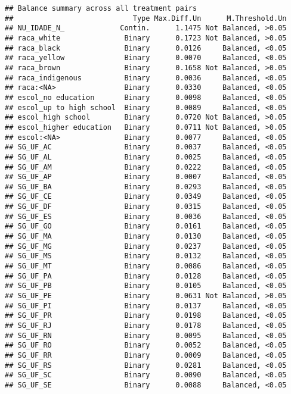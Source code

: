 \documentclass[
]{article}
\begin{document}
\begin{verbatim}
## Balance summary across all treatment pairs
##                            Type Max.Diff.Un      M.Threshold.Un
## NU_IDADE_N_             Contin.      1.1475 Not Balanced, >0.05
## raca_white               Binary      0.1723 Not Balanced, >0.05
## raca_black               Binary      0.0126     Balanced, <0.05
## raca_yellow              Binary      0.0070     Balanced, <0.05
## raca_brown               Binary      0.1658 Not Balanced, >0.05
## raca_indigenous          Binary      0.0036     Balanced, <0.05
## raca:<NA>                Binary      0.0330     Balanced, <0.05
## escol_no education       Binary      0.0098     Balanced, <0.05
## escol_up to high school  Binary      0.0089     Balanced, <0.05
## escol_high school        Binary      0.0720 Not Balanced, >0.05
## escol_higher education   Binary      0.0711 Not Balanced, >0.05
## escol:<NA>               Binary      0.0077     Balanced, <0.05
## SG_UF_AC                 Binary      0.0037     Balanced, <0.05
## SG_UF_AL                 Binary      0.0025     Balanced, <0.05
## SG_UF_AM                 Binary      0.0222     Balanced, <0.05
## SG_UF_AP                 Binary      0.0007     Balanced, <0.05
## SG_UF_BA                 Binary      0.0293     Balanced, <0.05
## SG_UF_CE                 Binary      0.0349     Balanced, <0.05
## SG_UF_DF                 Binary      0.0315     Balanced, <0.05
## SG_UF_ES                 Binary      0.0036     Balanced, <0.05
## SG_UF_GO                 Binary      0.0161     Balanced, <0.05
## SG_UF_MA                 Binary      0.0130     Balanced, <0.05
## SG_UF_MG                 Binary      0.0237     Balanced, <0.05
## SG_UF_MS                 Binary      0.0132     Balanced, <0.05
## SG_UF_MT                 Binary      0.0086     Balanced, <0.05
## SG_UF_PA                 Binary      0.0128     Balanced, <0.05
## SG_UF_PB                 Binary      0.0105     Balanced, <0.05
## SG_UF_PE                 Binary      0.0631 Not Balanced, >0.05
## SG_UF_PI                 Binary      0.0137     Balanced, <0.05
## SG_UF_PR                 Binary      0.0198     Balanced, <0.05
## SG_UF_RJ                 Binary      0.0178     Balanced, <0.05
## SG_UF_RN                 Binary      0.0095     Balanced, <0.05
## SG_UF_RO                 Binary      0.0052     Balanced, <0.05
## SG_UF_RR                 Binary      0.0009     Balanced, <0.05
## SG_UF_RS                 Binary      0.0281     Balanced, <0.05
## SG_UF_SC                 Binary      0.0090     Balanced, <0.05
## SG_UF_SE                 Binary      0.0088     Balanced, <0.05

\end{verbatim}
\end{document}
